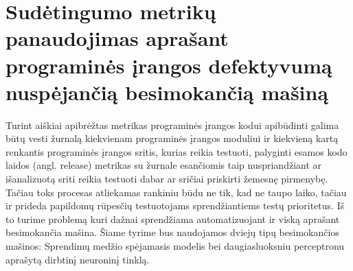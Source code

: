 \documentclass{VUMIFPSbakalaurinis}
\begin{document}
\section{Sudėtingumo metrikų panaudojimas aprašant programinės įrangos defektyvumą nuspėjančią besimokančią mašiną}

Turint aiškiai apibrėžtas metrikas programinės įrangos kodui apibūdinti galima būtų vesti žurnalą kiekvienam programinės įrangos moduliui ir kiekvieną kartą renkantis programinės įrangos sritis, kurias reikia testuoti, palyginti esamos kodo laidos (angl. release) metrikas su žurnale esančiomis taip nuspriandžiant ar išanalizuotą sriti reikia testuoti dabar ar sričiai priskirti žemesnę pirmenybę. Tačiau toks procesas atliekamas rankiniu būdu ne tik, kad ne taupo laiko, tačiau ir prideda papildomų rūpesčių testuotojams sprendžiantiems testų prioritetus. Iš to turime problemą kuri dažnai sprendžiama automatizuojant ir viską aprašant besimokančia mašina. Šiame tyrime bus naudojamos dviejų tipų besimokančios mašinos: Sprendimų medžio spėjamasis modelis bei daugiasluoksniu perceptronu aprašytą dirbtinį neuroninį tinklą.
\end{document}
